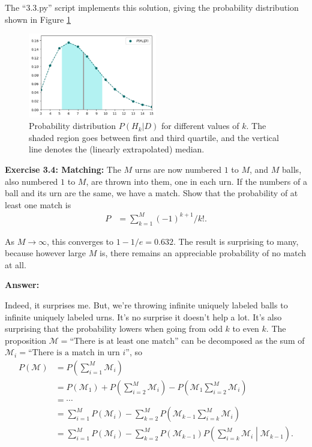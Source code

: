\documentclass{article}
\begin{document}
The ``3.3.py'' script implements this solution, giving the probability distribution shown in Figure \ref{fig:3.3}
\begin{figure}[h]
	\center
	\includegraphics[width=0.5\textwidth]{Numerical/3.3.png}
	\caption{Probability distribution $P(H_k|D)$ for different values of $k$. The shaded region goes between first and third quartile, and the vertical line denotes the (linearly extrapolated) median.}
	\label{fig:3.3}
\end{figure}

\textbf{Exercise 3.4: Matching: }The $M$ urns are now numbered $1$ to $M$, and $M$ balls, also numbered $1$ to $M$, are thrown into them, one in each urn. If the numbers of a ball and its urn are the same, we have a match. Show that the probability of at least one match is
\begin{align*}
	P&=\sum_{k=1}^M(-1)^{k+1}/k!.
\end{align*}

As $M\rightarrow\infty$, this converges to $1-1/e=0.632$. The result is surprising to many, because however large $M$ is, there remains an appreciable probability of no match at all.

\textbf{Answer:}

Indeed, it surprises me. But, we're throwing infinite uniquely labeled balls to infinite uniquely labeled urns. It's no surprise it doesn't help a lot. It's also surprising that the probability lowers when going from odd $k$ to even $k$. The proposition $\mathcal M=\text{``There is at least one match''}$ can be decomposed as the sum of $\mathcal M_i=\text{``There is a match in urn $i$''}$, so
\begin{align}
	P(\mathcal M)&=P\left(\sum_{i=1}^M\mathcal M_i\right)\\
	&=P(\mathcal M_1)+P\left(\sum_{i=2}^M\mathcal M_i\right)-P\left(\mathcal M_1\sum_{i=2}^M\mathcal M_i\right)\\
	&=\cdots\\
	&=\sum_{i=1}^MP(\mathcal M_i)-\sum_{k=2}^MP\left(\mathcal M_{k-1}\sum_{i=k}^M\mathcal M_i\right)\\
	&=\sum_{i=1}^MP(\mathcal M_i)-\sum_{k=2}^MP(\mathcal M_{k-1})P\left(\sum_{i=k}^M\mathcal M_i\middle|\mathcal M_{k-1}\right).
\end{align}
\end{document}
